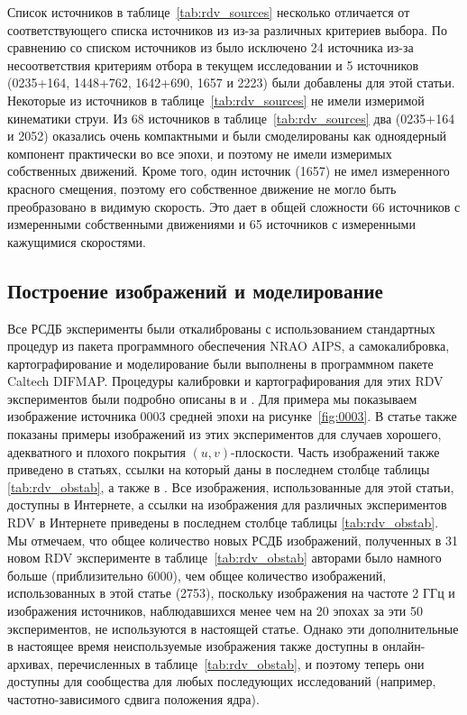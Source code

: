 Список источников в таблице~\ref{tab:rdv_sources} несколько отличается от соответствующего списка
источников из \cite{Piner_2007} из-за различных критериев выбора. По сравнению со списком источников
из \cite{Piner_2007} было исключено 24 источника из-за несоответствия критериям отбора в текущем
исследовании и 5 источников (0235+164, 1448+762, 1642+690, 1657 и 2223)
были добавлены для этой статьи. Некоторые из источников в таблице~\ref{tab:rdv_sources} не имели
измеримой кинематики струи. Из 68 источников в таблице~\ref{tab:rdv_sources} два (0235+164 и
2052) оказались очень компактными и были смоделированы как одноядерный компонент
практически во все эпохи, и поэтому не имели измеримых собственных движений. Кроме того, один
источник (1657) не имел измеренного красного смещения, поэтому его собственное движение
не могло быть преобразовано в видимую скорость. Это дает в общей сложности 66 источников с
измеренными собственными движениями и 65 источников с измеренными кажущимися скоростями.

\subsection{Построение изображений и моделирование}

Все РСДБ эксперименты были откалиброваны с использованием стандартных процедур из пакета
программного обеспечения NRAO AIPS, а самокалибровка, картографирование и моделирование были
выполнены в программном пакете Caltech DIFMAP. Процедуры калибровки и картографирования для этих RDV
экспериментов были подробно описаны в \cite{Piner_2007} и \cite{Pushkarev_2012b}. Для примера мы
показываем изображение источника 0003 средней эпохи на рисунке~\ref{fig:0003}. В статье
\cite{Piner_2007} также показаны примеры изображений из этих экспериментов для случаев хорошего,
адекватного и плохого покрытия $(u, v)$-плоскости. Часть изображений также приведено в статьях,
ссылки на который даны в последнем столбце таблицы \ref{tab:rdv_obstab}, а также в
\cite{Pushkarev_2012b}. Все изображения, использованные для этой статьи, доступны в Интернете, а
ссылки на изображения для различных экспериментов RDV в Интернете приведены в последнем столбце
таблицы \ref{tab:rdv_obstab}. Мы отмечаем, что общее количество новых РСДБ изображений, полученных в
31 новом RDV эксперименте в таблице~\ref{tab:rdv_obstab} авторами было намного больше
(приблизительно 6000), чем общее количество изображений, использованных в этой статье (2753),
поскольку изображения на частоте 2 ГГц и изображения источников, наблюдавшихся менее чем на 20
эпохах за эти 50 экспериментов, не используются в настоящей статье. Однако эти дополнительные в
настоящее время неиспользуемые изображения также доступны в онлайн-архивах, перечисленных в
таблице~\ref{tab:rdv_obstab}, и поэтому теперь они доступны для сообщества для любых последующих
исследований (например, частотно-зависимого сдвига положения ядра).

